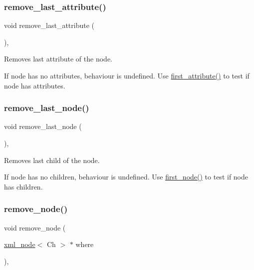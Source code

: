 \subsubsection{\texorpdfstring{remove\+\_\+last\+\_\+attribute()}{remove\_last\_attribute()}}
{\footnotesize\ttfamily void remove\+\_\+last\+\_\+attribute (\begin{DoxyParamCaption}{ }\end{DoxyParamCaption})\hspace{0.3cm}{\ttfamily [inline]}, {\ttfamily [inherited]}}



Removes last attribute of the node. 

If node has no attributes, behaviour is undefined. Use \mbox{\hyperlink{classrapidxml_1_1xml__node_a3cbbee0d76d96c3315cc9d80d169c8d9}{first\+\_\+attribute()}} to test if node has attributes. \mbox{\label{classrapidxml_1_1xml__node_a87addf2bc127ee31aa4b5295d3c9b530}} 
\subsubsection{\texorpdfstring{remove\+\_\+last\+\_\+node()}{remove\_last\_node()}}
{\footnotesize\ttfamily void remove\+\_\+last\+\_\+node (\begin{DoxyParamCaption}{ }\end{DoxyParamCaption})\hspace{0.3cm}{\ttfamily [inline]}, {\ttfamily [inherited]}}



Removes last child of the node. 

If node has no children, behaviour is undefined. Use \mbox{\hyperlink{classrapidxml_1_1xml__node_a1290dd3cfbf7cc6384593104635c96cd}{first\+\_\+node()}} to test if node has children. \mbox{\label{classrapidxml_1_1xml__node_a9316463a2201631e7e2062b17729f9cd}} 
\subsubsection{\texorpdfstring{remove\+\_\+node()}{remove\_node()}}
{\footnotesize\ttfamily void remove\+\_\+node (\begin{DoxyParamCaption}\item[{\mbox{\hyperlink{classrapidxml_1_1xml__node}{xml\+\_\+node}}$<$ Ch $>$ $\ast$}]{where }\end{DoxyParamCaption})\hspace{0.3cm}{\ttfamily [inline]}, {\ttfamily [inherited]}}



